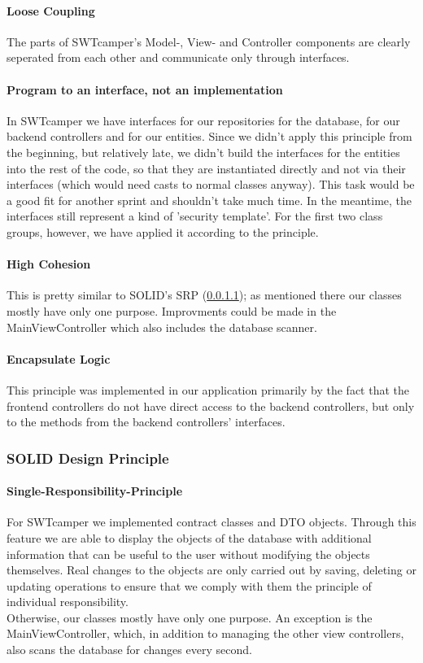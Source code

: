 \paragraph{Loose Coupling}
The parts of SWTcamper's Model-, View- and Controller components are clearly seperated from each other and communicate only through interfaces.

\paragraph{Program to an interface, not an implementation}
In SWTcamper we have interfaces for our repositories for the database, for our backend controllers and for our entities. Since we didn't apply this principle from the beginning, but relatively late, we didn't build the interfaces for the entities into the rest of the code, so that they are instantiated directly and not via their interfaces (which would need casts to normal classes anyway). This task would be a good fit for another sprint and shouldn't take much time. In the meantime, the interfaces still represent a kind of 'security template'. For the first two class groups, however, we have applied it according to the principle.

\paragraph{High Cohesion}
This is pretty similar to SOLID's SRP (\ref{subsec:solid:srp}); as mentioned there our classes mostly have only one purpose. Improvments could be made in the MainViewController which also includes the database scanner.

\paragraph{Encapsulate Logic}
This principle was implemented in our application primarily by the fact that the frontend controllers do not have direct access to the backend controllers, but only to the methods from the backend controllers' interfaces.

\subsubsection{SOLID Design Principle}

\paragraph{Single-Responsibility-Principle}
\label{subsec:solid:srp}
For SWTcamper we implemented contract classes and DTO objects. Through this
feature we are able to display the objects of the database with additional information that
can be useful to the user without modifying the objects themselves. Real changes to the objects
are only carried out by saving, deleting or updating operations to ensure that we comply with them
the principle of individual responsibility. \\
Otherwise, our classes mostly have only one purpose. An exception is the MainViewController, which, in addition to managing the other view controllers, also scans the database for changes every second.

